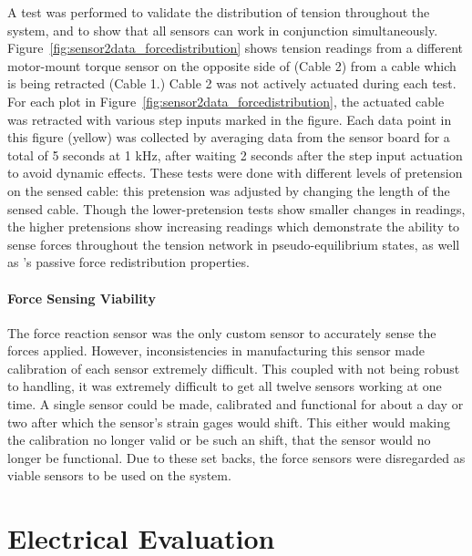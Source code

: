 \begin{appendices}
A test was performed to validate the distribution of tension throughout the system, and to show that all sensors can work in conjunction simultaneously.
Figure~\ref{fig:sensor2data_forcedistribution} shows tension readings from a different motor-mount torque sensor on the opposite side of \SB{} (Cable 2) from a cable which is being retracted (Cable 1.)
Cable 2 was not actively actuated during each test.
For each plot in Figure~\ref{fig:sensor2data_forcedistribution}, the actuated cable was retracted with various step inputs marked in the figure.
Each data point in this figure (yellow) was collected by averaging data from the sensor board for a total of 5 seconds at 1 kHz, after waiting 2 seconds after the step input actuation to avoid dynamic effects.
These tests were done with different levels of pretension on the sensed cable: this pretension was adjusted by changing the length of the sensed cable.
Though the lower-pretension tests show smaller changes in readings, the higher pretensions show increasing readings which demonstrate the ability to sense forces throughout the tension network in pseudo-equilibrium states, as well as \SB{}'s passive force redistribution properties.

\paragraph{Force Sensing Viability}
The force reaction sensor was the only custom sensor to accurately sense the forces applied.
However, inconsistencies in manufacturing this sensor made calibration of each sensor extremely difficult.
This coupled with not being robust to handling, it was extremely difficult to get all twelve sensors working at one time.
A single sensor could be made, calibrated and functional for about a day or two after which the sensor's strain gages would shift.
This either would making the calibration no longer valid or be such an shift, that the sensor would no longer be functional.
Due to these set backs, the force sensors were disregarded as viable sensors to be used on the system.

\section{Electrical Evaluation}


\end{appendices}
